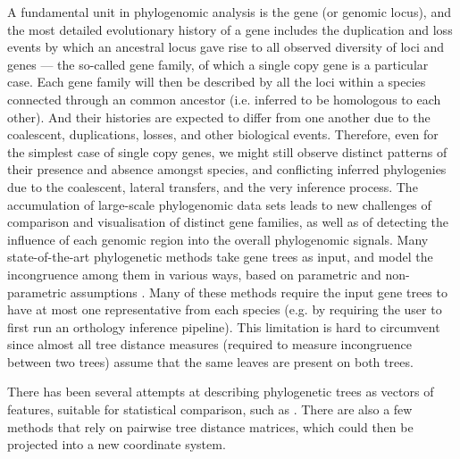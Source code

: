 
A fundamental unit in phylogenomic analysis is the gene (or genomic locus), and the most detailed evolutionary
history of a gene includes the duplication and loss events by which an ancestral locus gave rise to all
observed diversity of loci and genes --- the so-called gene family, of which a single copy gene is a particular case.
Each gene family will then be described by all the loci within a species connected through an common ancestor 
(i.e. inferred to be homologous to each other).
And their histories are expected to differ from one another due to the coalescent, duplications, losses, and
other biological events.
Therefore, even for the simplest case of single copy genes, we might still observe distinct patterns of their presence and
absence amongst species, and conflicting inferred phylogenies due to the coalescent, lateral transfers, and the very
inference process. 
The accumulation of large-scale phylogenomic data sets leads to new challenges of comparison and visualisation of
distinct gene families, as well as of detecting the influence of each genomic region into the overall phylogenomic
signals.
Many state-of-the-art phylogenetic methods take gene trees as input, and model the incongruence among them in
various ways, based on parametric and non-parametric assumptions \citep{astral, astrid}.
Many of these methods require the input gene trees to have at most one
representative from each species (e.g. by requiring the user to first run an orthology inference pipeline). 
This limitation is hard to circumvent since almost all tree distance measures (required to measure incongruence between
two trees) assume that the same leaves are present on both trees.

There has been several attempts at describing phylogenetic trees as vectors of features, suitable for statistical
comparison, such as \cite{Leigh2008, Leigh2011, Susko2006, Narechania2016, Nye2011, Yoshida2015, Lewitus2015,
Kendall2016, Colijn2018}. 
There are also a few methods that rely on pairwise tree distance matrices, which could then be projected into a new
coordinate system.

